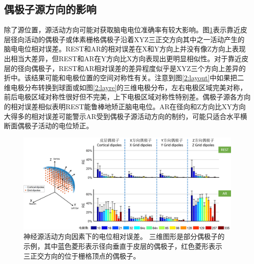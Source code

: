 \subsection{偶极子源方向的影响}
除了源位置，源活动方向可能对获取脑电电位准确率有较大影响。图\ref{2:orie}表示靠近皮层径向活动的偶极子或体素栅格偶极子沿着XYZ三正交方向其中之一活动产生的脑电电位相对误差。REST和AR的相对误差在X和Y方向上并没有像Z方向上表现出相当大差异，但REST和AR在Y方向比X方向表现出更明显相似性。对于靠近皮层的径向偶极子，REST和AR相对误差的差异程度似乎是XYZ三个方向上差异的折中。该结果可能和电极位置的空间对称性有关。注意到图\ref{2:layout}中如果把二维电极分布转换到球面或如图\ref{2:layre}的三维电极分布，左右电极区域完美对称，前后电极区域对称性很好但不完美，上下电极区域对称性特别差。偶极子源各方向的相对误差相似表明REST能鲁棒地矫正脑电电位。AR在径向和Z方向比XY方向大得多的相对误差可能警示AR受到偶极子源活动方向的制约，可能只适合水平横断面偶极子活动的电位矫正。
\begin{figure}[h!]
	\centering
	\includegraphics[width=15cm]{pic/JNE/figure7.png}
	\caption{神经源活动方向因素下的电位相对误差。 三维图形是部分偶极子的示例，其中蓝色菱形表示径向垂直于皮层的偶极子，红色菱形表示
	三正交方向的位于栅格顶点的偶极子。}
	\label{2:orie}
\end{figure}

